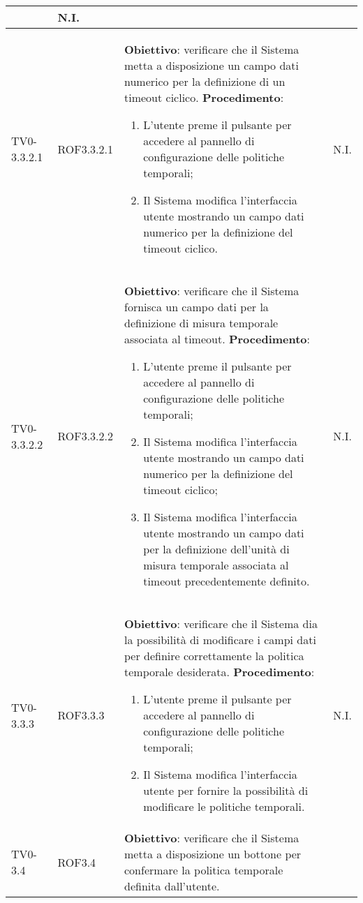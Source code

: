 \begin{longtable}{|C{.15\textwidth}|C{.13\textwidth}|m{.52\textwidth}|C{.08\textwidth}|}
\begin{enumerate}
	\end{enumerate}
	& N.I. \\
\hline
 TV0-3.3.2.1 & ROF3.3.2.1 &
	\textbf{Obiettivo}: verificare che il Sistema metta a disposizione un campo dati numerico per la definizione di un timeout ciclico. \newline
	\textbf{Procedimento}:
	\begin{enumerate}
		\item L'utente preme il pulsante per accedere al pannello di configurazione delle politiche temporali;
		\item Il Sistema modifica l'interfaccia utente mostrando un campo dati numerico per la definizione del timeout ciclico.
	\end{enumerate}
	& N.I. \\
\hline
{}TV0-3.3.2.2 & ROF3.3.2.2 &
	\textbf{Obiettivo}: verificare che il Sistema fornisca un campo dati per la definizione di misura temporale associata al timeout. \newline
	\textbf{Procedimento}:
	\begin{enumerate}
		\item L'utente preme il pulsante per accedere al pannello di configurazione delle politiche temporali;
		\item Il Sistema modifica l'interfaccia utente mostrando un campo dati numerico per la definizione del timeout ciclico;
		\item Il Sistema modifica l'interfaccia utente mostrando un campo dati per la definizione dell'unità di misura temporale associata al timeout precedentemente definito.
	\end{enumerate}
	& N.I. \\
\hline
TV0-3.3.3 & ROF3.3.3 &
	\textbf{Obiettivo}: verificare che il Sistema dia la possibilità di modificare i campi dati per definire correttamente la politica temporale desiderata. \newline
	\textbf{Procedimento}:
	\begin{enumerate}
		\item L'utente preme il pulsante per accedere al pannello di configurazione delle politiche temporali;
		\item Il Sistema modifica l'interfaccia utente per fornire la possibilità di modificare le politiche temporali.
	\end{enumerate}
	& N.I. \\
\hline
{}TV0-3.4 & ROF3.4 &
	\textbf{Obiettivo}: verificare che il Sistema metta a disposizione un bottone per confermare la politica temporale definita dall'utente. \newline

\end{longtable}

